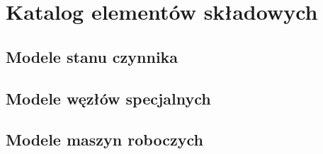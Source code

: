 \section{Katalog elementów składowych}

\subsection{Modele stanu czynnika}





\subsection{Modele węzłów specjalnych}






\subsection{Modele maszyn roboczych}

\newcommand\wykresTs[2][]{
	\subfloat[][Wykres T-s przemiany]{
		\begin{tikzpicture}
			\begin{axis}[
				xtick=\empty,
				ytick=\empty,
				axis lines=left,
				ylabel=T,
				xlabel=s,
				height=5cm,
				clip=false,
				every axis x label/.style={at={(xticklabel cs:.95,.2cm)}},
				every axis y label/.style={at={(yticklabel cs:.9,.2cm)}},
				#1
			]
				\addplot+[no marks, smooth] table[x=s, y=T] {wykresy/_nasyc.txt};
				#2
			\end{axis}
		\end{tikzpicture}
	}
}








